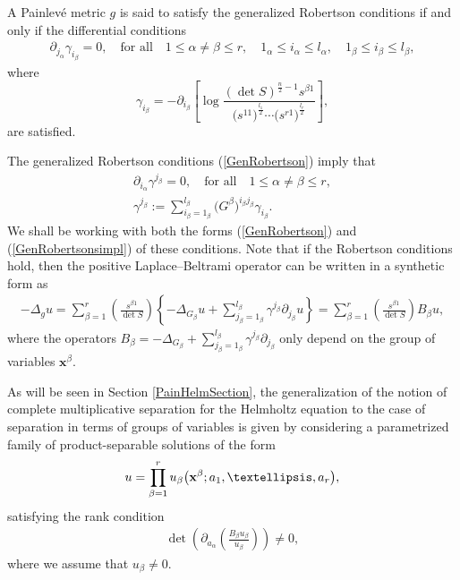 \documentclass[11pt]{article}
\numberwithin{equation}{section}
\newcommand{\ialpha}{i_{\alpha}}
\newcommand{\jbeta}{j_{\beta}}
\begin{document}
\begin{Definition} \label{defiRC}
A Painlev\'e metric $g$ is said to satisfy the generalized Robertson conditions if and only if the differential conditions
	\begin{gather}\label{GenRobertson}
\partial_{j_{\alpha}}\gamma_{i_{\beta}}=0,\quad \textrm{for all} \quad 1\leq \alpha \neq \beta \leq r, \quad 1_{\alpha}\leq i_{\alpha} \leq l_{\alpha},\quad 1_{\beta}\leq i_{\beta} \leq l_{\beta},
\end{gather}
where
\[
\gamma_{i_{\beta}}=-\partial_{i_{\beta}}\left[\log \frac{(\det S)^{\frac{n}{2}-1}s^{\beta 1}}{\big(s^{11}\big)^{\frac{l_1}{2}} \cdots \big(s^{r1}\big)^{\frac{l_r}{2}}}\right],
\]
are satisfied.
\end{Definition}
The generalized Robertson conditions (\ref{GenRobertson}) imply that
\begin{gather}\label{GenRobertsonsimpl}
\partial_{\ialpha}\gamma^{\jbeta}=0, \quad \textrm{for all} \quad 1\leq \alpha \neq \beta \leq r,\\
\label{gammaup}
\gamma^{j_{\beta}}:= \sum_{i_{\beta}=1_{\beta}}^{l_{\beta}}\big(G^{\beta}\big)^{i_{\beta}j_{\beta}} \gamma_{i_{\beta}}.
\end{gather}
We shall be working with both the forms (\ref{GenRobertson}) and (\ref{GenRobertsonsimpl}) of these conditions. Note that if the Robertson conditions hold, then the positive Laplace--Beltrami operator can be written in a synthetic form as
\begin{gather*}%
 -\Delta_{g} u  =   \sum_{\beta=1}^{r} \left(\frac{s^{\beta 1}}{\det S}\right)\left\{-\Delta_{G_{\beta}}u + \sum_{{j}_{\beta}=1_{\beta}}^{l_{\beta}} \gamma^{j_{\beta}} \partial_{j_{\beta}}u\right\}
   =   \sum_{\beta=1}^{r} \left(\frac{s^{\beta 1}}{\det S}\right) B_\beta u , \nonumber
\end{gather*}
where the operators $B_\beta = -\Delta_{G_{\beta}} + \sum\limits_{{j}_{\beta}=1_{\beta}}^{l_{\beta}} \gamma^{j_{\beta}} \partial_{j_{\beta}}$ only depend on the group of variables $\textbf{x}^\beta$.

As will be seen in Section \ref{PainHelmSection}, the generalization of the notion of complete multiplicative separation for the Helmholtz equation to the case of separation in terms of groups of variables is given by considering a parametrized family of product-separable solutions of the form
\begin{gather} \label{SeparabilitySchro}
u=\prod_{\beta =1}^{r}u_{\beta}\big({\bf x}^{\beta};a_{1},\dots,a_{r}\big),
\end{gather}
satisfying the rank condition
\begin{gather} \label{RankPainSchro}
 \det  \left( \partial_{a_\alpha} \left( \frac{B_\beta u_\beta}{u_\beta} \right) \right) \ne 0,
\end{gather}
where we assume that $u_{\beta}\neq 0$.
\end{document}
